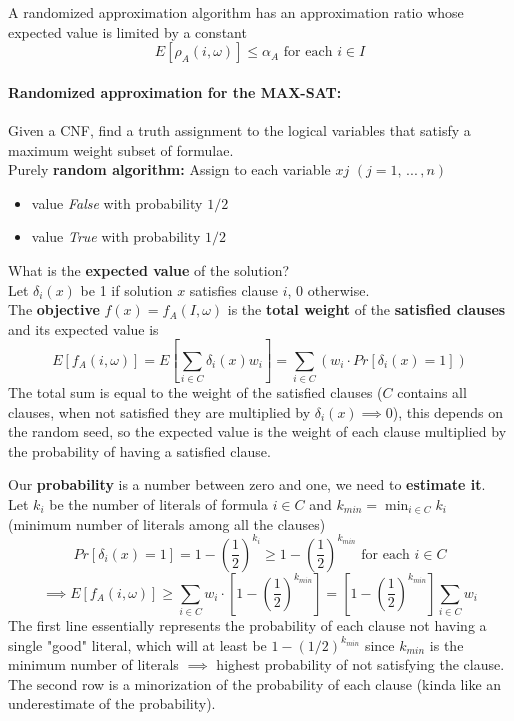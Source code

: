 A randomized approximation algorithm has an approximation ratio whose expected value is limited by a constant
$$ E \left[\rho_A (i, \omega)\right] \leq \alpha_A \text{ for each } i \in I $$

\paragraph{Randomized approximation for the MAX-SAT:} Given a CNF, find a truth assignment to the logical variables that satisfy a maximum weight subset of formulae.\\

Purely \textbf{random algorithm:} Assign to each variable $xj$ $(j = 1, \, ... \, , n)$
\begin{itemize}
	\item value \textit{False} with probability $1/2$
	\item value \textit{True} with probability $1/2$
\end{itemize}
What is the \textbf{expected value} of the solution? \\

Let $\delta_i (x)$ be 1 if solution $x$ satisfies clause $i$, 0 otherwise.\\

The \textbf{objective} $f (x) = f_A (I , \omega)$ is the \textbf{total weight} of the \textbf{satisfied clauses} and its expected value is
$$ E \left[f_A (i, \omega)\right] = E \left[\sum_{i \in C} \delta_i (x) w_i \right] = \sum_{i \in C} \left(w_i \cdot Pr \left[\delta_i (x) = 1\right]\right)$$
The total sum is equal to the weight of the satisfied clauses ($C$ contains all clauses, when not satisfied they are multiplied by $\delta_i (x) \implies 0$), this depends on the random seed, so the expected value is the weight of each clause multiplied by the probability of having a satisfied clause.\\

\newpage

Our \textbf{probability} is a number between zero and one, we need to \textbf{estimate it}.\\
Let $k_i$ be the number of literals of formula $i \in C$ and $k_{min} = \min_{i \in C} k_i$ (minimum number of literals among all the clauses)
$$ Pr \left[\delta_i (x) = 1\right] = 1 - \left(\frac{1}{2}\right)^{k_i} \geq 1 - \left(\frac{1}{2}\right)^{k_{min}} \text{ for each } i \in C $$
$$ \implies E \left[f_A (i, \omega)\right] \geq \sum_{i \in C} w_i \cdot \left[1 - \left(\frac{1}{2}\right)^{k_{min}}\right] = \left[1 - \left(\frac{1}{2}\right)^{k_{min}}\right] \sum_{i \in C} w_i $$
The first line essentially represents the probability of each clause not having a single "good" literal, which will at least be $1 - (1/2)^{k_{min}}$ since $k_{min}$ is the minimum number of literals $\implies$ highest probability of not satisfying the clause.\\
The second row is a minorization of the probability of each clause (kinda like an underestimate of the probability).\\

